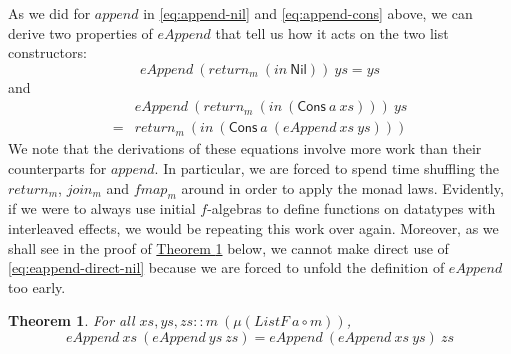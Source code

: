 \documentclass{jfp1}
\newtheorem{theorem}{Theorem}
\newcommand{\thmref}[1]{\hyperref[#1]{Theorem \ref*{#1}}}
\begin{document}
As we did for $\mathit{append}$ in \autoref{eq:append-nil} and
\autoref{eq:append-cons} above, we can derive two properties of
$\mathit{eAppend}$ that tell us how it acts on the two list
constructors:
\begin{equation}
  \label{eq:eappend-direct-nil}
  \mathit{eAppend}~(\mathit{return}_m~(\mathit{in}~\mathsf{Nil}))~\mathit{ys} = \mathit{ys}
\end{equation}
and
\begin{equation}\label{eq:eappend-direct-cons}
  \begin{array}{cl}
    & \mathit{eAppend}~(\mathit{return}_m~(\mathit{in}~(\mathsf{Cons}~a~\mathit{xs})))~\mathit{ys} \\ 
    =&\mathit{return}_m~(\mathit{in}~(\mathsf{Cons}~a~(\mathit{eAppend}~\mathit{xs}~\mathit{ys})))
  \end{array}
\end{equation}
We note that the derivations of these equations involve more work
than their counterparts for $\mathit{append}$. In particular, we are
forced to spend time shuffling the $\mathit{return_m}$,
$\mathit{join_m}$ and $\mathit{fmap_m}$ around in order to apply the
monad laws. Evidently, if we were to always use initial $f$-algebras
to define functions on datatypes with interleaved effects, we would be
repeating this work over again. Moreover, as we shall see in the proof
of \thmref{thm:direct-eappend-assoc} below, we cannot make direct use
of \autoref{eq:eappend-direct-nil} because we are forced to unfold
the definition of $\mathit{eAppend}$ too early.

\begin{theorem}\label{thm:direct-eappend-assoc}
  For all $\mathit{xs}, \mathit{ys}, \mathit{zs} :: m~(\mu (\mathit{ListF}~a \circ m))$,
  \begin{displaymath}
    \mathit{eAppend}~\mathit{xs}~(\mathit{eAppend}~\mathit{ys}~\mathit{zs}) = \mathit{eAppend}~(\mathit{eAppend}~\mathit{xs}~\mathit{ys})~\mathit{zs}
  \end{displaymath}
\end{theorem}
\end{document}
